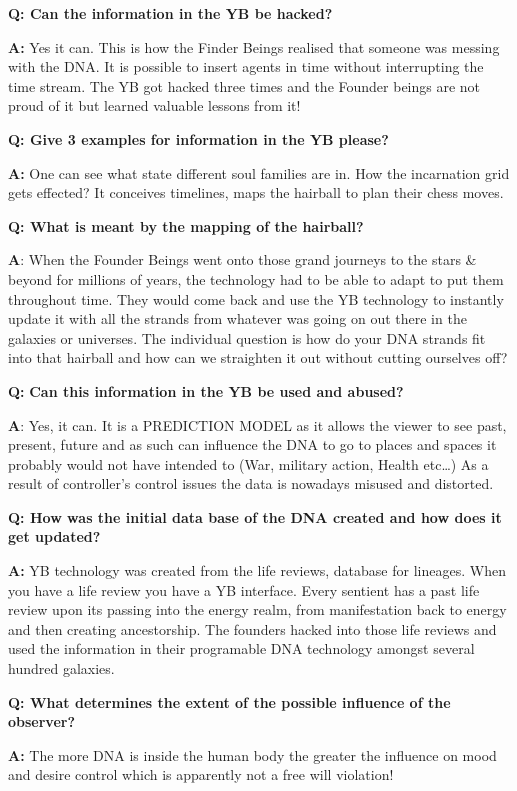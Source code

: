 \textbf{Q: Can the information in the YB be hacked?}

\textbf{A:} Yes it can. This is how the Finder Beings realised that
someone was messing with the DNA. It is possible to insert agents in
time without interrupting the time stream. The YB got hacked three times
and the Founder beings are not proud of it but learned valuable lessons
from it!

\textbf{Q: Give 3 examples for information in the YB please?}

\textbf{A:} One can see what state different soul families are in. How
the incarnation grid gets effected? It conceives timelines, maps the
hairball to plan their chess moves.

\textbf{Q: What is meant by the mapping of the hairball?}

\textbf{A}: When the Founder Beings went onto those grand journeys to
the stars \& beyond for millions of years, the technology had to be able
to adapt to put them throughout time. They would come back and use the
YB technology to instantly update it with all the strands from whatever
was going on out there in the galaxies or universes. The individual
question is how do your DNA strands fit into that hairball and how can
we straighten it out without cutting ourselves off?

\textbf{Q:} \textbf{Can this information in the YB be used and abused?}

\textbf{A}: Yes, it can. It is a PREDICTION MODEL as it allows the
viewer to see past, present, future and as such can influence the DNA to
go to places and spaces it probably would not have intended to (War,
military action, Health etc\ldots{}) As a result of controller's control
issues the data is nowadays misused and distorted.

\textbf{Q: How was the initial data base of the DNA created and how does
it get updated?}

\textbf{A:} YB technology was created from the life reviews, database
for lineages. When you have a life review you have a YB interface. Every
sentient has a past life review upon its passing into the energy realm,
from manifestation back to energy and then creating ancestorship. The
founders hacked into those life reviews and used the information in
their programable DNA technology amongst several hundred galaxies.

\textbf{Q: What determines the extent of the possible influence of the
observer?}

\textbf{A:} The more DNA is inside the human body the greater the
influence on mood and desire control which is apparently not a free will
violation!

